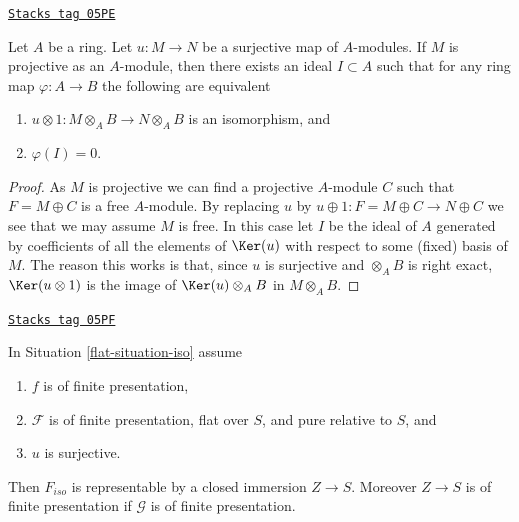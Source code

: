 \begin{lemma}
\label{flat-lemma-flattening-module-map}
\href{https://stacks.math.columbia.edu/tag/05PE}{\texttt{Stacks tag 05PE}}

Let $A$ be a ring. Let $u : M \to N$ be a surjective map of $A$-modules.
If $M$ is projective as an $A$-module, then there exists an ideal
$I \subset A$ such that for any ring map $\varphi : A \to B$
the following are equivalent
\begin{enumerate}
\item $u \otimes 1 : M \otimes_A B \to N \otimes_A B$ is an
isomorphism, and
\item $\varphi(I) = 0$.
\end{enumerate}
\end{lemma}

\begin{proof}
As $M$ is projective we can find a projective $A$-module $C$
such that $F = M \oplus C$ is a free $A$-module.
By replacing $u$ by $u \oplus 1 : F = M \oplus C \to N \oplus C$
we see that we may assume $M$ is free. In this case let $I$ be
the ideal of $A$ generated by coefficients of all the elements of
$\Ker(u)$ with respect to some (fixed) basis of $M$.
The reason this works is that, since $u$ is surjective and
$\otimes_A B$ is right exact, $\Ker(u \otimes 1)$ is
the image of $\Ker(u) \otimes_A B$ in $M \otimes_A B$.
\end{proof}

\begin{theorem}
\label{flat-theorem-flattening-map}
\href{https://stacks.math.columbia.edu/tag/05PF}{\texttt{Stacks tag 05PF}}

In
Situation \ref{flat-situation-iso}
assume
\begin{enumerate}
\item $f$ is of finite presentation,
\item $\mathcal{F}$ is of finite presentation, flat over $S$, and
pure relative to $S$, and
\item $u$ is surjective.
\end{enumerate}
Then $F_{iso}$ is representable by a closed immersion $Z \to S$.
Moreover $Z \to S$ is of finite presentation if $\mathcal{G}$ is
of finite presentation.
\end{theorem}

